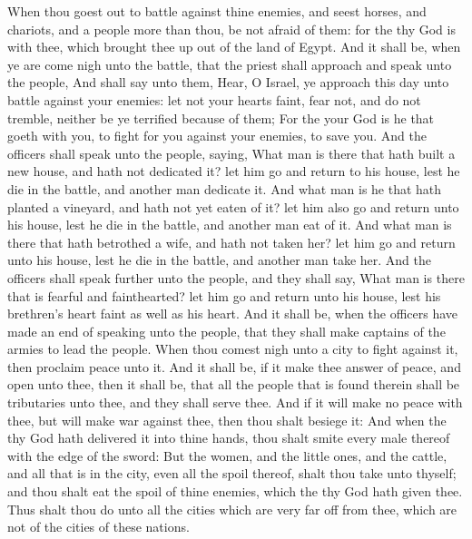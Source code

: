 \begin{biblechapter} %
 When thou goest out to battle against thine enemies, and seest horses, and chariots, and a people more than thou, be not afraid of them: for the \LORD thy God is with thee, which brought thee up out of the land of Egypt.
\verse And it shall be, when ye are come nigh unto the battle, that the priest shall approach and speak unto the people,
\verse And shall say unto them, Hear, O Israel, ye approach this day unto battle against your enemies: let not your hearts faint, fear not, and do not tremble, neither be ye terrified because of them;
\verse For the \LORD your God is he that goeth with you, to fight for you against your enemies, to save you.
\verse And the officers shall speak unto the people, saying, What man is there that hath built a new house, and hath not dedicated it? let him go and return to his house, lest he die in the battle, and another man dedicate it.
\verse And what man is he that hath planted a vineyard, and hath not yet eaten of it? let him also go and return unto his house, lest he die in the battle, and another man eat of it.
\verse And what man is there that hath betrothed a wife, and hath not taken her? let him go and return unto his house, lest he die in the battle, and another man take her.
\verse And the officers shall speak further unto the people, and they shall say, What man is there that is fearful and fainthearted? let him go and return unto his house, lest his brethren's heart faint as well as his heart.
\verse And it shall be, when the officers have made an end of speaking unto the people, that they shall make captains of the armies to lead the people.
\verse When thou comest nigh unto a city to fight against it, then proclaim peace unto it.
\verse And it shall be, if it make thee answer of peace, and open unto thee, then it shall be, that all the people that is found therein shall be tributaries unto thee, and they shall serve thee.
\verse And if it will make no peace with thee, but will make war against thee, then thou shalt besiege it:
\verse And when the \LORD thy God hath delivered it into thine hands, thou shalt smite every male thereof with the edge of the sword:
\verse But the women, and the little ones, and the cattle, and all that is in the city, even all the spoil thereof, shalt thou take unto thyself; and thou shalt eat the spoil of thine enemies, which the \LORD thy God hath given thee.
\verse Thus shalt thou do unto all the cities which are very far off from thee, which are not of the cities of these nations.

\end{biblechapter}
